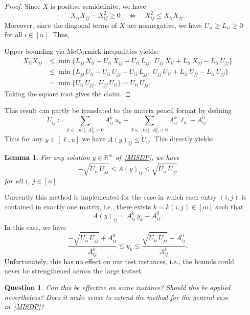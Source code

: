 \documentclass[10pt, a4paper]{article}
\newcommand{\define}{\coloneqq}
\newcommand{\R}{\mathds{R}}
\newtheorem{lemma}[theorem]{Lemma}
\newtheorem{question}[theorem]{Question}
\begin{document}
\begin{proof}
  Since $X$ is positive semidefinite, we have
  \[
    X_{ii} X_{jj} - X_{ij}^2 \geq 0
    \quad\Leftrightarrow\quad
    X_{ij}^2 \leq X_{ii} X_{jj}.
  \]
  Moreover, since the diagonal terms of $X$ are nonnegative, we have
  $U_{ii} \geq L_{ii} \geq 0$ for all $i \in [n]$. Thus,

  Upper bounding via
  McCormick inequalities yields:
  \begin{align*}
    X_{ii} X_{jj} & \leq \min \{L_{jj}\, X_{ii} + U_{ii}\, X_{jj} - U_{ii}\, L_{jj},\;
                    U_{jj}\, X_{ii} + L_{ii}\, X_{jj} - L_{ii}\, U_{jj}\}  \\
    & \leq \min \{L_{jj}\, U_{ii} + U_{ii}\, U_{jj} - U_{ii}\, L_{jj},\;
                    U_{jj}\, U_{ii} + L_{ii}\, U_{jj} - L_{ii}\, U_{jj}\}  \\
    & = \min \{U_{ii}\, U_{jj},\;  U_{jj}\, U_{ii}\} = U_{ii}\, U_{jj}.
  \end{align*}
  Taking the square root gives the claim.
\end{proof}

This result can partly be translated to the matrix pencil format by defining
\[
  \tilde{U}_{ij} \define \sum_{k \in [m]: A^k_{ij} > 0} A^k_{ij}\, u_k -
  \sum_{k \in [m]: A^k_{ij} < 0} A^k_{ij}\, \ell_k - A^0_{ij}.
\]
Thus for any $y \in [\ell,u]$ we have $A(y)_{ij} \leq \tilde{U}_{ij}$. This
directly yields:

\begin{lemma}
  For any solution $y \in \R^m$ of~\eqref{MISDP}, we have
  \[
    -\sqrt{\tilde{U}_{ii}\,\tilde{U}_{jj}} \leq A(y)_{ij} \leq \sqrt{\tilde{U}_{ii}\,\tilde{U}_{jj}}
  \]
  for all $i$, $j \in [n]$.
\end{lemma}

Currently this method is implemented for the case in which each entry
$(i,j)$ is contained in exactly one matrix, i.e., there exists
$k = k(i,j) \in [m]$ such that
\[
  A(y)_{ij} = A^k_{ij}\, y_k - A^0_{ij}.
\]
In this case, we have
\[
  \frac{-\sqrt{\tilde{U}_{ii}\,\tilde{U}_{jj}} + A^0_{ij}}{A^k_{ij}} \leq y_k \leq
  \frac{\sqrt{\tilde{U}_{ii}\,\tilde{U}_{jj}} + A^0_{ij}}{A^k_{ij}}.
\]
Unfortunately, this has no effect on our test instances, i.e., the bounds
could never be strengthened across the large testset.

\begin{question}
  Can this be effective on some instance? Should this be applied
  nevertheless? Does it make sense to extend the method for the general
  case in~\eqref{MISDP}?
\end{question}
\end{document}
